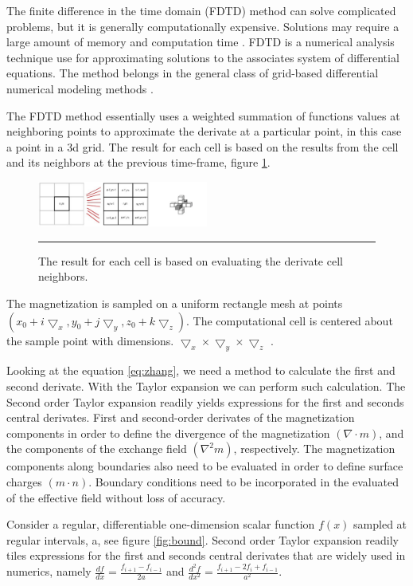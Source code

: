 The finite difference in the time domain (FDTD) method can solve complicated problems, but it is generally computationally expensive. Solutions may require a large amount of memory and computation time \cite{ufdtd}. FDTD is a numerical analysis technique use for approximating solutions to the associates system of differential equations. The method belongs in the general class of grid-based differential numerical modeling methods \cite{methods}.

The FDTD method essentially uses a weighted summation of functions values at neighboring points to approximate the derivate at a particular point, in this case a point in a 3d grid. The result for each cell is based on the results from the cell and its neighbors at the previous time-frame, figure \ref{fig:fdtd}.  

\begin{figure}[htbp]
	\centering
		\includegraphics[width=0.5\textwidth]{Figures/fdtd.png}
		\rule{35em}{0.2pt}
	\caption[FDTD grid]{The result for each cell is based on evaluating the derivate cell neighbors.}
	\label{fig:fdtd}
\end{figure}

The magnetization is sampled on a uniform rectangle mesh at points $(x_0 + i\bigtriangledown_x, y_0 + j\bigtriangledown_y, z_0 + k\bigtriangledown_z)$. The computational cell is centered about the sample point with dimensions. $\bigtriangledown_x \times \bigtriangledown_y \times \bigtriangledown_z$ \cite{methods}.

Looking at the equation \ref{eq:zhang}, we need a method to calculate the first and second derivate. With the Taylor expansion we can perform such calculation. The Second order Taylor expansion readily yields expressions for the first and seconds central derivates. First and second-order derivates of the magnetization components in order to define the divergence  of the magnetization $(\nabla \cdot m)$, and the components of the exchange field $(\nabla^2m)$, respectively. The magnetization components along boundaries also need to be evaluated in order to define surface charges $(m \cdot n)$. Boundary conditions need to be incorporated in the evaluated of the effective field without loss of accuracy. 

Consider a regular, differentiable one-dimension  scalar function $f(x)$ sampled at regular intervals, a, see figure  \ref{fig:bound}. Second order Taylor expansion readily tiles expressions for the first and seconds central derivates that are widely used in numerics, namely $\frac{df}{dx} = \frac{f_{i+1} - f_{i-1}}{2a}$ and $\frac{d^2f}{dx^2} = \frac{f_{i+1} - 2f_i + f_{i-1}}{a^2}$.

